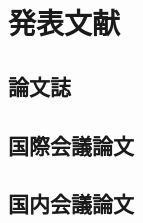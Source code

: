 \documentclass[12pt,a4paper,oneside,onecolumn,fleqn,dvipdfmx]{jreport}
\begin{document}
    \chapter*{発表文献}

        \section*{論文誌}

        \section*{国際会議論文}

        \section*{国内会議論文}
\end{document}

